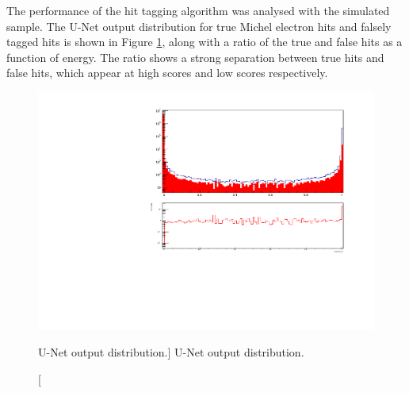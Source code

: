 The performance of the hit tagging algorithm was analysed with the simulated
sample. The U-Net output distribution for true Michel electron hits and falsely
tagged hits is shown in Figure \ref{fig:unet_pred}, along with a ratio of the
true and false hits as a function of energy. The ratio shows a strong
separation between true hits and false hits, which appear at high scores and low
scores respectively.
\begin{figure}
	\centering
	\includegraphics[width=\textwidth]{figures/unet_pred.pdf}
	\caption
	[U-Net output distribution.]
	{U-Net output distribution.}
	\label{fig:unet_pred}
\end{figure}

